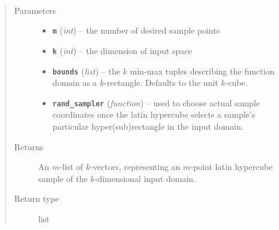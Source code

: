 \documentclass[letterpaper,10pt,english]{sphinxmanual}
\begin{document}
\label{index:module-smbo.samplers}\label{index:module-samplers}

\begin{fulllineitems}
\label{index:smbo.samplers.latin_hypercube}~\begin{quote}\begin{description}
\item[{Parameters}] \leavevmode\begin{itemize}
\item {} 
\textbf{\texttt{m}} (\emph{int}) -- the number of desired sample points

\item {} 
\textbf{\texttt{k}} (\emph{int}) -- the dimension of input space

\item {} 
\textbf{\texttt{bounds}} (\emph{list}) -- the \(k\) min-max tuples describing the function domain as a \(k\)-rectangle. Defaults to the unit \(k\)-cube.

\item {} 
\textbf{\texttt{rand\_sampler}} (\emph{function}) -- used to choose actual sample coordinates once the latin hypercube selects a sample's particular hyper(sub)rectangle in the input domain.

\end{itemize}

\item[{Returns}] \leavevmode
An \(m\)-list of \(k\)-vectors, representing an \(m\)-point latin hypercube sample of the \(k\)-dimensional input domain.

\item[{Return type}] \leavevmode
list

\end{description}\end{quote}

\end{fulllineitems}

\label{index:module-smbo.lazyprop}\label{index:module-lazyprop}
\end{document}
